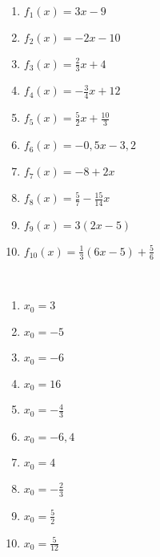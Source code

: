 \begin{Exercise}[title={Bestimme die Nullstellen}, label=nullstellenA1]\ \\
	\begin{minipage}{0.5\textwidth}
		\begin{enumerate}[label=\alph*)]
			\item $f_1(x)=3x-9$
			\item $f_2(x)=-2x-10$
			\item $f_3(x)=\frac{2}{3}x+4$
			\item $f_4(x)=-\frac{3}{4}x+12$
			\item $f_5(x)=\frac{5}{2}x+\frac{10}{3}$
		\end{enumerate}
	\end{minipage}
	\begin{minipage}{0.5\textwidth}
		\begin{enumerate}[label=\alph*)]
			\setcounter{enumi}{5}
			\item $f_6(x)=-0,5x-3,2$
			\item $f_7(x)=-8+2x$
			\item $f_8(x)=\frac{5}{7}-\frac{15}{14}x$
			\item $f_9(x)=3(2x-5)$
			\item $f_{10}(x)=\frac{1}{3}\left(6x-5\right)+\frac{5}{6}$
		\end{enumerate}
	\end{minipage}
\end{Exercise}\vspace{0,5cm}
\begin{Answer}[ref=nullstellenA1]\\
	\begin{minipage}{0.5\textwidth}
		\begin{enumerate}[label=\alph*)]
			\item $x_0=3$
			\item $x_0=-5$
			\item $x_0=-6$
			\item $x_0=16$
			\item $x_0=-\frac{4}{3}$
		\end{enumerate}
	\end{minipage}
	\begin{minipage}{0.5\textwidth}
		\begin{enumerate}[label=\alph*)]
			\setcounter{enumi}{5}
			\item $x_0=-6,4$
			\item $x_0=4$
			\item $x_0=-\frac{2}{3}$
			\item $x_0=\frac{5}{2}$
			\item $x_0=\frac{5}{12}$
		\end{enumerate}
	\end{minipage}
\end{Answer}